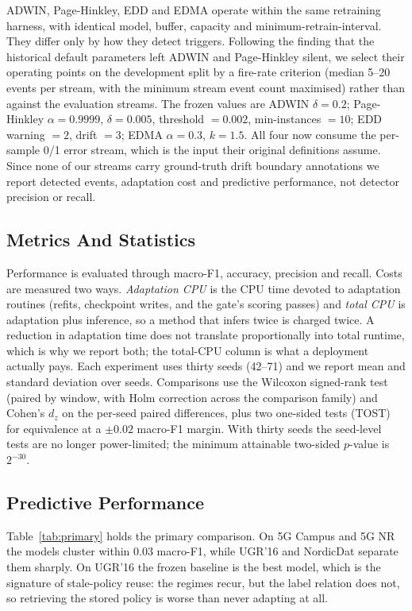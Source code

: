 \documentclass[conference]{IEEEtran}
\begin{document}
ADWIN, Page-Hinkley, EDD and EDMA operate within the same retraining harness, with identical model, buffer, capacity and minimum-retrain-interval. They differ only by how they detect triggers. Following the finding that the historical default parameters left ADWIN and Page-Hinkley silent, we select their operating points on the development split by a fire-rate criterion (median 5--20 events per stream, with the minimum stream event count maximised) rather than against the evaluation streams. The frozen values are ADWIN $\delta=0.2$; Page-Hinkley $\alpha=0.9999$, $\delta=0.005$, threshold $=0.002$, min-instances $=10$; EDD warning $=2$, drift $=3$; EDMA $\alpha=0.3$, $k=1.5$. All four now consume the per-sample 0/1 error stream, which is the input their original definitions assume. Since none of our streams carry ground-truth drift boundary annotations we report detected events, adaptation cost and predictive performance, not detector precision or recall.


\subsection{Metrics And Statistics}
Performance is evaluated through macro-F1, accuracy, precision and recall. Costs are measured two ways. \emph{Adaptation CPU} is the CPU time devoted to adaptation routines (refits, checkpoint writes, and the gate's scoring passes) and \emph{total CPU} is adaptation plus inference, so a method that infers twice is charged twice. A reduction in adaptation time does not translate proportionally into total runtime, which is why we report both; the total-CPU column is what a deployment actually pays. Each experiment uses thirty seeds (42--71) and we report mean and standard deviation over seeds. Comparisons use the Wilcoxon signed-rank test (paired by window, with Holm correction across the comparison family) and Cohen's $d_z$ on the per-seed paired differences, plus two one-sided tests (TOST) for equivalence at a $\pm0.02$ macro-F1 margin. With thirty seeds the seed-level tests are no longer power-limited; the minimum attainable two-sided $p$-value is $2^{-30}$.


\subsection{Predictive Performance}
Table~\ref{tab:primary} holds the primary comparison. On 5G Campus and 5G NR the models cluster within $0.03$ macro-F1, while UGR'16 and NordicDat separate them sharply. On UGR'16 the frozen baseline is the best model, which is the signature of stale-policy reuse: the regimes recur, but the label relation does not, so retrieving the stored policy is worse than never adapting at all.
\end{document}
